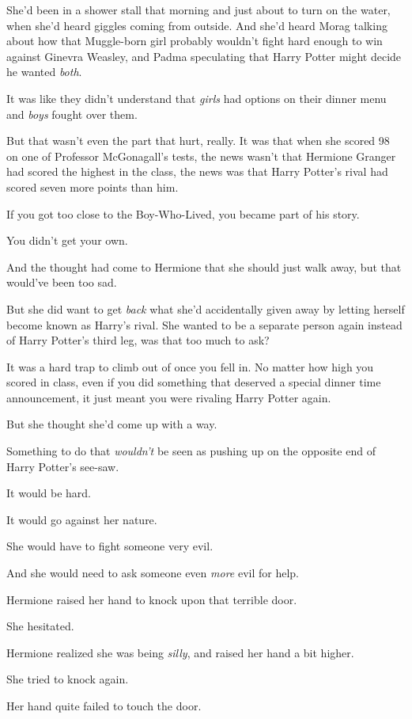 She'd been in a shower stall that morning and just about to turn on the water, when she'd heard giggles coming from outside. And she'd heard Morag talking about how that Muggle-born girl probably wouldn't fight hard enough to win against Ginevra Weasley, and Padma speculating that Harry Potter might decide he wanted \emph{both}.

It was like they didn't understand that \emph{girls} had options on their dinner menu and \emph{boys} fought over them.

But that wasn't even the part that hurt, really. It was that when she scored 98 on one of Professor McGonagall's tests, the news wasn't that Hermione Granger had scored the highest in the class, the news was that Harry Potter's rival had scored seven more points than him.

If you got too close to the Boy-Who-Lived, you became part of his story.

You didn't get your own.

And the thought had come to Hermione that she should just walk away, but that would've been too sad.

But she did want to get \emph{back} what she'd accidentally given away by letting herself become known as Harry's rival. She wanted to be a separate person again instead of Harry Potter's third leg, was that too much to ask?

It was a hard trap to climb out of once you fell in. No matter how high you scored in class, even if you did something that deserved a special dinner time announcement, it just meant you were rivaling Harry Potter again.

But she thought she'd come up with a way.

Something to do that \emph{wouldn't} be seen as pushing up on the opposite end of Harry Potter's see-saw.

It would be hard.

It would go against her nature.

She would have to fight someone very evil.

And she would need to ask someone even \emph{more} evil for help.

Hermione raised her hand to knock upon that terrible door.

She hesitated.

Hermione realized she was being \emph{silly}, and raised her hand a bit higher.

She tried to knock again.

Her hand quite failed to touch the door.

